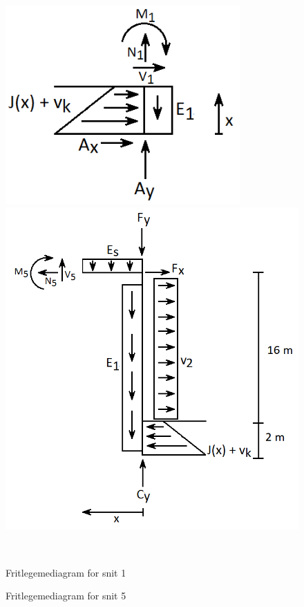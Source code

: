 \begin{figure}[H]\centering
	\begin{minipage}[b]{0.48\textwidth}\centering
		\includegraphics[width=0.80\textwidth]{billeder/snitet.png} %
	\end{minipage}\hfill
	\begin{minipage}[b]{0.48\textwidth}\centering
		\includegraphics[width=1.0\textwidth]{billeder/snitfem.png} %
	\end{minipage}\\ %
	\begin{minipage}[t]{0.48\textwidth}
		\caption{Fritlegemediagram for snit 1} %
		\label{fig:snitet}
	\end{minipage}\hfill
	\begin{minipage}[t]{0.48\textwidth}
		\caption{Fritlegemediagram for snit 5} %
		\label{fig:snitfem}
	\end{minipage}
\end{figure}

